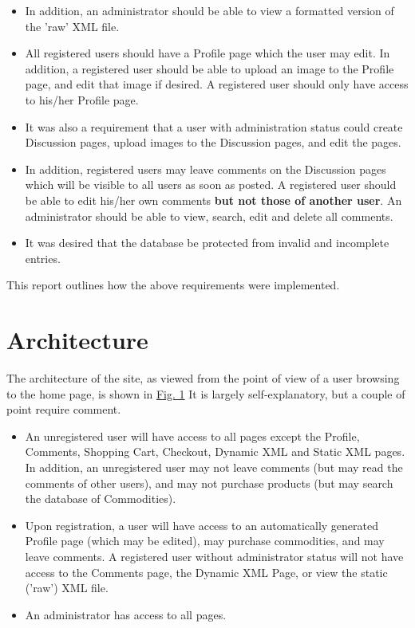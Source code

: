 \documentclass[11pt]{article}
\begin{document}
\begin{itemize}
\item[]In addition, an administrator should be able to view a formatted version of the 'raw' XML file. 
\item[] All registered users should have a Profile page which the user may edit. In addition, a registered user should be able
to upload an image to the Profile page, and edit that image if desired. A registered user should only have access to his/her Profile page. 
\item[] It was also a requirement that a user with administration status could create Discussion pages, upload images to the
Discussion pages, and edit the pages. 
\item[]In addition, registered users may leave comments on the Discussion pages which will  be visible to all users as soon
as posted. A registered user should be able to edit his/her own comments \textbf{but not those of another user}.   
An administrator should be able to view, search, edit and delete all comments. 
\item[] It was desired that the database be protected from invalid and incomplete entries.
\end{itemize}

This report outlines how the above requirements were implemented. 





  








\hypertarget{label:sectmeARCH}{ \section{Architecture}\label{label:mearch}}

The architecture of the site, as viewed from the point of view of a user browsing to the home
page, is shown in \hyperlink{label:figsitemap}{Fig. 1}
It is largely self-explanatory, but a couple of point require comment.
\begin{itemize}
\item[] An unregistered user will have access to all pages except the Profile, Comments, Shopping Cart, Checkout,
Dynamic XML and Static XML pages. In addition, an unregistered user may not leave comments (but may read the comments
of other users), and may not purchase products (but may search the database of Commodities). 
\item[] Upon registration, a user will have access to an automatically generated Profile page (which may be edited), may
purchase commodities, and may leave comments. A registered user without administrator status will not have access to the
Comments page, the Dynamic XML Page, or view the static ('raw') XML file.   
\item[] An administrator has access to all pages. 
\end{itemize}
\end{document}
